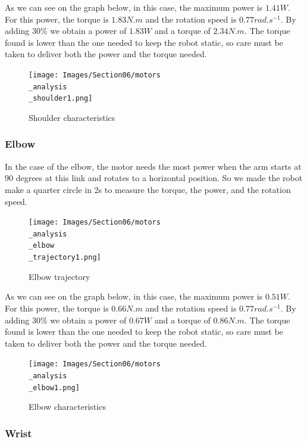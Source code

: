 \bigbreak
As we can see on the graph below, in this case, the maximum power is $1.41W$. For this power, the torque is $1.83N.m$ and the rotation speed is $0.77rad.s^{-1}$. By adding 30\% we obtain a power of $1.83W$ and a torque of $2.34N.m$. The torque found is lower than the one needed to keep the robot static, so care must be taken to deliver both the power and the torque needed.
\begin{figure}[ht]
    \centering
    \texttt{[image: Images/Section06/motors\\\_analysis\\\_shoulder1.png]}
    \caption{Shoulder characteristics}
    \label{fig:ShoulderCharacteristics}
\end{figure}
\FloatBarrier

\subsubsection{Elbow}

In the case of the elbow, the motor needs the most power when the arm starts at 90 degrees at this link and rotates to a horizontal position. So we made the robot make a quarter circle in 2s to measure the torque, the power, and the rotation speed.

\begin{figure}[ht]
    \centering
    \texttt{[image: Images/Section06/motors\\\_analysis\\\_elbow\\\_trajectory1.png]}
    \caption{Elbow trajectory}
    \label{fig:ElbowTrajectory}
\end{figure}
\FloatBarrier

As we can see on the graph below, in this case, the maximum power is $0.51W$. For this power, the torque is $0.66N.m$ and the rotation speed is $0.77rad.s^{-1}$. By adding 30\% we obtain a power of $0.67W$ and a torque of $0.86N.m$. The torque found is lower than the one needed to keep the robot static, so care must be taken to deliver both the power and the torque needed.
\begin{figure}[ht]
    \centering
    \texttt{[image: Images/Section06/motors\\\_analysis\\\_elbow1.png]}
    \caption{Elbow characteristics}
    \label{fig:ElbowCharacteristics}
\end{figure}
\FloatBarrier

\subsubsection{Wrist}


